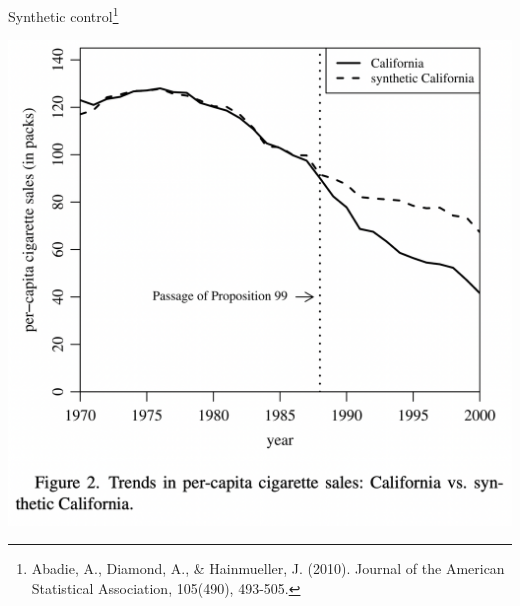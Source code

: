 \documentclass{beamer}
\newcommand\bref[2]{\href{#1}{\color{blue}{#2}}}
\begin{document}
\begin{frame}{Synthetic control\footnote{Abadie, A., Diamond, A., \& Hainmueller, J. (2010). \bref{http://www.jenshainmueller.de/Paper/ccs.pdf}{Synthetic control methods for comparative case studies: Estimating the effect of California’s tobacco control program.} Journal of the American Statistical Association, 105(490), 493-505.}}

\centering
\includegraphics[height = .6\textheight]{figures/synth_fig2}

\end{frame}
\end{document}
